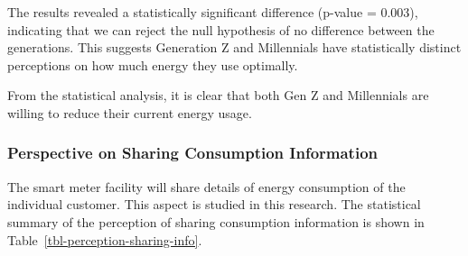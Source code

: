 \documentclass[
  letterpaper,
  DIV=11,
  numbers=noendperiod]{scrartcl}
\begin{document}
The results revealed a statistically significant difference (p-value =
0.003), indicating that we can reject the null hypothesis of no
difference between the generations. This suggests Generation Z and
Millennials have statistically distinct perceptions on how much energy
they use optimally.

From the statistical analysis, it is clear that both Gen Z and
Millennials are willing to reduce their current energy usage.

\subsubsection{Perspective on Sharing Consumption
Information}\label{perspective-on-sharing-consumption-information}

The smart meter facility will share details of energy consumption of the
individual customer. This aspect is studied in this research. The
statistical summary of the perception of sharing consumption information
is shown in Table~\ref{tbl-perception-sharing-info}.
\end{document}
